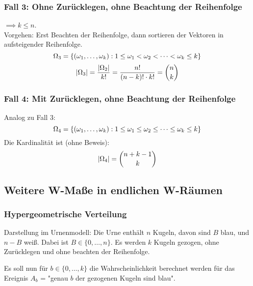 \subsubsection[Urnenmodell, Fall 3]{Fall 3: Ohne Zurücklegen, ohne Beachtung der Reihenfolge}
\label{sec:urne3}
$\implies k \leq n$.\\
Vorgehen: Erst Beachten der Reihenfolge, dann sortieren der Vektoren in aufsteigender Reihenfolge.
\begin{equation*}
    \Omega_3 = \{ (\omega_1, \dots ,\omega_k): 1 \leq \omega_1 < \omega_2 < \dots < \omega_k \leq k \}
\end{equation*}
\begin{equation*}
    |\Omega_3| = \frac{|\Omega_2|}{k!} = \frac{n!}{(n-k)! \cdot k!} = \binom{n}{k}
\end{equation*}

\subsubsection{Fall 4: Mit Zurücklegen, ohne Beachtung der Reihenfolge}
Analog zu Fall 3:
\begin{equation*}
    \Omega_4 = \{ (\omega_1, \dots ,\omega_k): 1 \leq \omega_1 \leq \omega_2 \leq \dots \leq \omega_k \leq k \}
\end{equation*}
Die Kardinalität ist (ohne Beweis):
\begin{equation*}
    |\Omega_4| = \binom{n+k-1}{k}
\end{equation*}

\subsection{Weitere W-Maße in endlichen W-Räumen}
\subsubsection{Hypergeometrische Verteilung}
Darstellung im Urnenmodell: Die Urne enthält $n$ Kugeln, davon sind $B$ blau, und $n-B$ weiß.
Dabei ist $B \in \{0,\dots ,n\}$. Es werden $k$ Kugeln gezogen, ohne Zurücklegen und ohne beachten
der Reihenfolge.

Es soll nun für $b \in  \{0,\dots ,k\}$ die Wahrscheinlichkeit berechnet werden für das Ereignis
$A_b$ = "genau $b$ der gezogenen Kugeln sind blau".

